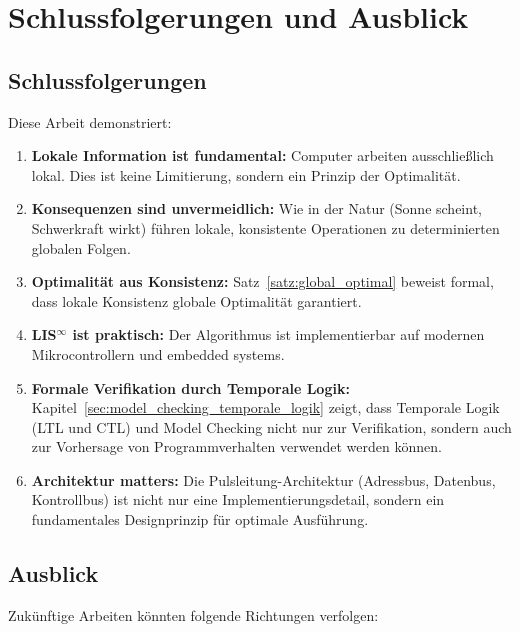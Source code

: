 \documentclass[a4paper,12pt]{article}
\theoremstyle{definition}
\begin{document}
	\section{Schlussfolgerungen und Ausblick}
	\label{sec:schlussfolgerungen}
	
	\subsection{Schlussfolgerungen}
	
	Diese Arbeit demonstriert:
	
	\begin{enumerate}
		\item \textbf{Lokale Information ist fundamental:} Computer arbeiten ausschließlich lokal. Dies ist keine Limitierung, sondern ein Prinzip der Optimalität.
		
		\item \textbf{Konsequenzen sind unvermeidlich:} Wie in der Natur (Sonne scheint, Schwerkraft wirkt) führen lokale, konsistente Operationen zu determinierten globalen Folgen.
		
		\item \textbf{Optimalität aus Konsistenz:} Satz~\ref{satz:global_optimal} beweist formal, dass lokale Konsistenz globale Optimalität garantiert.
		
		\item \textbf{LIS$^{\infty}$ ist praktisch:} Der Algorithmus ist implementierbar auf modernen Mikrocontrollern und embedded systems.
		
		\item \textbf{Formale Verifikation durch Temporale Logik:} Kapitel~\ref{sec:model_checking_temporale_logik} zeigt, dass Temporale Logik (LTL und CTL) und Model Checking nicht nur zur Verifikation, sondern auch zur Vorhersage von Programmverhalten verwendet werden können.
		
		\item \textbf{Architektur matters:} Die Pulsleitung-Architektur (Adressbus, Datenbus, Kontrollbus) ist nicht nur eine Implementierungsdetail, sondern ein fundamentales Designprinzip für optimale Ausführung.
	\end{enumerate}
	
	\subsection{Ausblick}
	
	Zukünftige Arbeiten könnten folgende Richtungen verfolgen:
	
\end{document}
